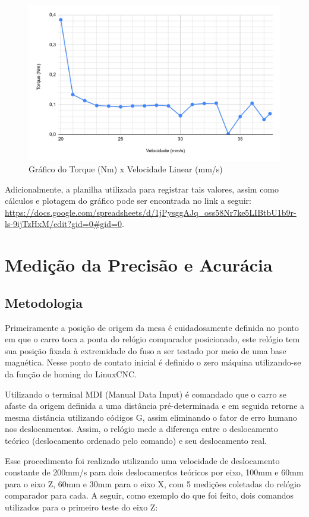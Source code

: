 \begin{figure}[H]
    \centering
    \includegraphics[width=0.85\linewidth]{images/Eletrica/Figura12.png}
    \caption{Gráfico do Torque (Nm) x Velocidade Linear (mm/s)}
    \label{fig:curva-motor}
\end{figure}

Adicionalmente, a planilha utilizada para registrar tais valores, assim como cálculos e plotagem do gráfico pode ser encontrada no link a seguir:  \url{https://docs.google.com/spreadsheets/d/1jPysggAJq_oss58Nr7ke5LIBtbU1b9r-ls-9ijTzHxM/edit?gid=0#gid=0}.


\section{Medição da Precisão e Acurácia}
\subsection{Metodologia} 
Primeiramente a posição de origem da mesa é cuidadosamente definida no ponto em que o carro toca a ponta do relógio comparador posicionado, este relógio tem sua posição fixada à extremidade do fuso a ser testado por meio de uma base magnética. Nesse ponto de contato inicial é definido o zero máquina utilizando-se da função de homing do LinuxCNC. 

Utilizando o terminal MDI (Manual Data Input) é comandado que o carro se afaste da origem definida a uma distância pré-determinada e em seguida retorne a mesma distância utilizando códigos G, assim eliminando o fator de erro humano nos deslocamentos. Assim, o relógio mede a diferença entre o deslocamento teórico (deslocamento ordenado pelo comando) e seu deslocamento real.

Esse procedimento foi realizado utilizando uma velocidade de deslocamento constante de 200mm/s para dois deslocamentos teóricos por eixo, 100mm e 60mm para o eixo Z, 60mm e 30mm para o eixo X, com 5 medições coletadas do relógio comparador para cada. A seguir, como exemplo do que foi feito, dois comandos utilizados para o primeiro teste do eixo Z:

